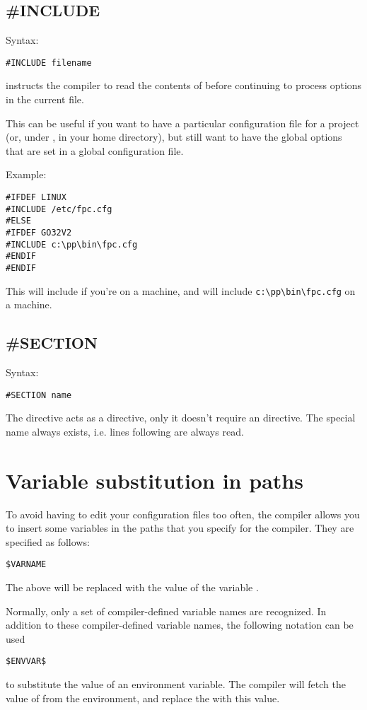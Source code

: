\subsection{\#INCLUDE}
Syntax:
\begin{verbatim}
#INCLUDE filename
\end{verbatim}
 instructs the compiler to read the contents of
 before continuing to process options in the current file.

This can be useful if you want to have a particular configuration file
for a project (or, under \linux, in your home directory), but still want to
have the global options that are set in a global configuration file.

Example:
\begin{verbatim}
#IFDEF LINUX
#INCLUDE /etc/fpc.cfg
#ELSE
#IFDEF GO32V2
#INCLUDE c:\pp\bin\fpc.cfg
#ENDIF
#ENDIF
\end{verbatim}
This will include  if you're on a \linux machine,
and will include \verb+c:\pp\bin\fpc.cfg+
on a \dos machine.

\subsection{\#SECTION}
Syntax:
\begin{verbatim}
#SECTION name
\end{verbatim}
The  directive acts as a  directive, only
it doesn't require an  directive. The special name 
always exists, i.e. lines following  are always read.

\section{Variable substitution in paths}
To avoid having to edit your configuration files too often, the compiler allows 
you to insert some variables in the paths that you specify for the compiler.
They are specified as follows:
\begin{verbatim}
$VARNAME
\end{verbatim}
The above will be replaced with the value of the variable . 

Normally, only a set of compiler-defined variable names are recognized. 
In addition to these compiler-defined variable names, the following 
notation can be used 
\begin{verbatim}
$ENVVAR$
\end{verbatim}
to substitute the value of an environment variable. The compiler will fetch
the value of  from the environment, and replace the
 with this value.

